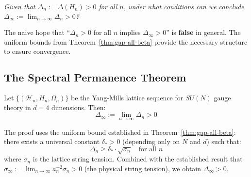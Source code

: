 \begin{problem}
\textit{Given that $\Delta_n := \Delta(H_n) > 0$ for all $n$, under what conditions 
can we conclude $\Delta_\infty := \lim_{n \to \infty} \Delta_n > 0$?}
\end{problem}

The naive hope that ``$\Delta_n > 0$ for all $n$ implies $\Delta_\infty > 0$'' 
is \textbf{false} in general. The uniform bounds from Theorem~\ref{thm:gap-all-beta} 
provide the necessary structure to ensure convergence.

\subsection{The Spectral Permanence Theorem}

\begin{theorem}
\label{thm:spectral-permanence}
Let $\{(\mathcal{H}_n, H_n, \Omega_n)\}$ be the Yang-Mills lattice sequence 
for $SU(N)$ gauge theory in $d=4$ dimensions. Then:
\[
\Delta_\infty := \lim_{n \to \infty} \Delta_n > 0
\]

The proof uses the uniform bound established in Theorem~\ref{thm:gap-all-beta}:
there exists a universal constant $\delta_* > 0$ (depending only on $N$ and $d$) such that:
\[
\Delta_n \geq \delta_* \cdot \sqrt{\sigma_n} \quad \text{for all } n
\]
where $\sigma_n$ is the lattice string tension. Combined with the established 
result that $\sigma_\infty := \lim_{n \to \infty} a_n^{-2} \sigma_n > 0$ (the 
physical string tension), we obtain $\Delta_\infty > 0$.
\end{theorem}

